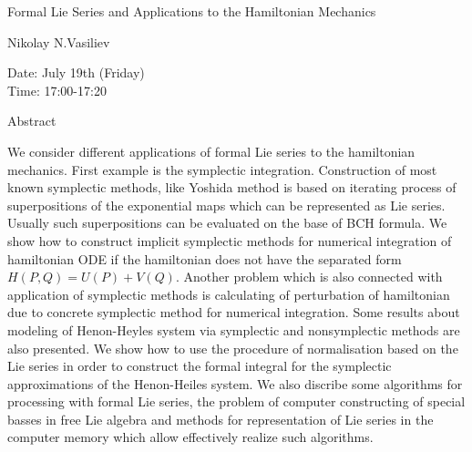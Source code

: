 \begin{center}
\LARGE
Formal Lie Series and Applications to the Hamiltonian
                           Mechanics

\end{center}

\begin{center}
\Large
Nikolay N.Vasiliev

\end{center}

\noindent
Date:  July 19th (Friday)\\
Time:  17:00-17:20\\

\begin{center}
\large
Abstract
\end{center}

We consider different applications of formal Lie series to the hamiltonian mechanics. First
example is the symplectic integration. Construction of most known symplectic methods, like
Yoshida method is based on iterating process of superpositions of the exponential maps which can
be represented as Lie series. Usually such superpositions can be evaluated on the base of BCH
formula. We show how to construct implicit symplectic methods for numerical integration of
hamiltonian ODE if the hamiltonian does not have the separated form $H(P,Q)=U(P)+V(Q)$.
Another problem which is also connected with application of symplectic methods is calculating of
perturbation of hamiltonian due to concrete symplectic method for numerical integration. Some
results about modeling of Henon-Heyles system via symplectic and nonsymplectic methods are
also presented. We show how to use the procedure of normalisation based on the Lie series in order
to construct the formal integral for the symplectic approximations of the Henon-Heiles system.
We also discribe some algorithms for processing with formal Lie series, the problem of computer
constructing of special basses in free Lie algebra and methods for representation of Lie series in
the computer memory which allow effectively realize such algorithms. 


